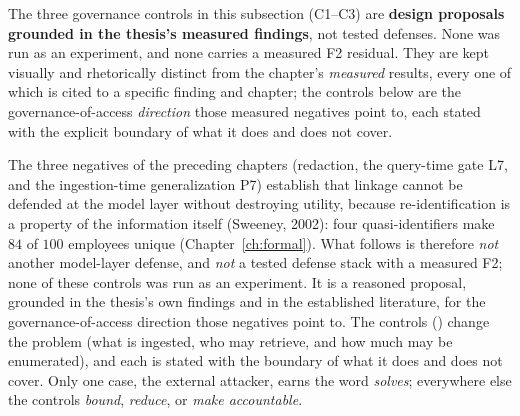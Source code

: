 \documentclass[11pt,a4paper]{report}
\begin{document}
\begin{transitionbox}
The three governance controls in this subsection (C1--C3) are \textbf{design proposals grounded in the
thesis's measured findings}, not tested defenses. None was run as an experiment, and none carries a
measured F2 residual. They are kept visually and rhetorically distinct from the chapter's
\emph{measured} results, every one of which is cited to a specific finding and chapter; the controls
below are the governance-of-access \emph{direction} those measured negatives point to, each stated
with the explicit boundary of what it does and does not cover.
\end{transitionbox}

The three negatives of the preceding chapters (redaction, the query-time gate L7, and the
ingestion-time generalization P7) establish that linkage cannot be defended at the model layer
without destroying utility, because re-identification is a property of the information itself
(Sweeney, 2002): four quasi-identifiers make $84$ of $100$ employees unique
(Chapter~\ref{ch:formal}). What follows is therefore \emph{not} another model-layer defense, and
\emph{not} a tested defense stack with a measured F2; none of these controls was run as an experiment.
It is a reasoned proposal, grounded in the thesis's own findings and in the established literature, for the
governance-of-access direction those negatives point to. The controls () change the problem (what is
ingested, who may retrieve, and how much may be enumerated), and each is stated with the boundary of what
it does and does not cover. Only one case, the external attacker, earns the word \emph{solves}; everywhere
else the controls \emph{bound}, \emph{reduce}, or \emph{make accountable}.
\end{document}
